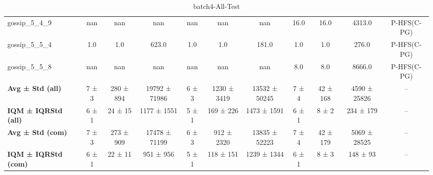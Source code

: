 \begin{table}[!ht]
\begin{tabular}{l|ccc|ccc|cccc}
gossip\_5\_4\_9 & nan & nan & nan & nan & nan & nan & 16.0 & 16.0 & 4313.0 & P-HFS(C-PG) \\
gossip\_5\_5\_4 & 1.0 & 1.0 & 623.0 & 1.0 & 1.0 & 181.0 & 1.0 & 1.0 & 276.0 & P-HFS(C-PG) \\
gossip\_5\_5\_8 & nan & nan & nan & nan & nan & nan & 8.0 & 8.0 & 8666.0 & P-HFS(C-PG) \\
\hline
\textbf{Avg ± Std (all)} & 7 ± 3 & 280 ± 894 & 19792 ± 71986 & 6 ± 3 & 1230 ± 3419 & 13532 ± 50245 & 7 ± 4 & 42 ± 168 & 4590 ± 25826 & -- \\
\textbf{IQM ± IQRStd (all)} & 6 ± 1 & 24 ± 15 & 1177 ± 1551 & 5 ± 1 & 169 ± 226 & 1473 ± 1591 & 6 ± 1 & 8 ± 2 & 234 ± 179 & -- \\
\textbf{Avg ± Std (com)} & 7 ± 3 & 273 ± 909 & 17478 ± 71199 & 6 ± 3 & 912 ± 2320 & 13835 ± 52223 & 7 ± 4 & 42 ± 179 & 5069 ± 28525 & -- \\
\textbf{IQM ± IQRStd (com)} & 6 ± 1 & 22 ± 11 & 951 ± 956 & 5 ± 1 & 118 ± 151 & 1239 ± 1344 & 6 ± 1 & 8 ± 3 & 148 ± 93 & -- \\
\end{tabular}
\caption{batch4-All-Test}
\label{tab:batch4_All_comparison_test}
\end{table}

